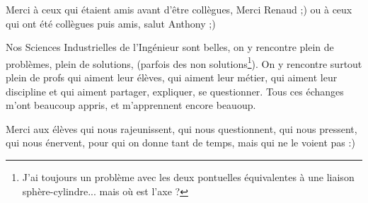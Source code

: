 Merci à ceux qui étaient amis avant d'être collègues, Merci Renaud ;) ou à ceux qui ont été collègues puis amis, salut Anthony ;)


Nos Sciences Industrielles de l'Ingénieur sont belles, on y rencontre plein de problèmes, plein de solutions, (parfois des non solutions\footnote{J'ai toujours un problème avec les deux pontuelles équivalentes à une liaison sphère-cylindre... mais où est l'axe ?}). 
On y rencontre surtout plein de profs qui aiment leur élèves, qui aiment leur métier, qui aiment leur discipline et qui aiment partager, expliquer, se questionner. Tous ces échanges m'ont beaucoup appris, et m'apprennent encore beauoup. 

Merci aux élèves qui nous rajeunissent, qui nous questionnent, qui nous pressent, qui nous énervent, pour qui on donne tant de temps, mais qui ne le voient pas :)
